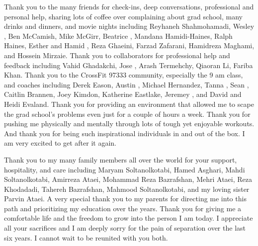 %
Thank you to the many friends for 
check-ins, deep conversations, professional and personal help, sharing lots of coffee over complaining about grad school, many drinks and dinners, and movie nights 
including
 Reyhaneh Shahmohamadi, Wesley ,
 Ben McCamish,  Mike McGirr, 
Beatrice , Mandana Hamidi-Haines, Ralph Haines, 
Esther and Hamid , Reza Ghaeini, Farzad Zafarani, Hamidreza Maghami, and Hossein Mirzaie.
Thank you to collaborators for professional help and feedback including
Vahid Ghadakchi, Jose , Arash Termehchy, Qiaoran Li, Fariba Khan.
Thank you to the CrossFit 97333 community, especially the 9 am class, 
and coaches including Derek Eason, Austin ,
Michael Hernandez, Tanna , Sean , Caitlin Brannen, Joey Kimdon, 
Katherine Eastlake, Jeremey , and David and Heidi Evaland.
Thank you for providing an environment that 
allowed me to scape the grad school's problems even just for a couple of hours a week. Thank you
for pushing me physically and mentally through lots of tough yet enjoyable workouts. And thank you
for being such inspirational individuals in and out of the box.
I am very excited to get after it again.
%
%

Thank you to my many family members all over the world for your support, hospitality, and care
including Maryam Soltanolkotabi, Hamed Asghari, Mahdi Soltanolkotabi, Amirreza Ataei, 
Mohammad Reza Bazrafshan, Mehri Ataei, Reza Khodadadi, Tahereh Bazrafshan, 
Mahmood Soltanolkotabi, and my loving sister Parvin Ataei. A very special thank you
to my parents for directing me into this path and prioritizing my education over the years. 
Thank you for giving me a comfortable life and the freedom to grow into the person I am today.
I appreciate all your sacrifices and I am deeply sorry for the pain of separation over the last six 
years. I cannot wait to be reunited with you both.
